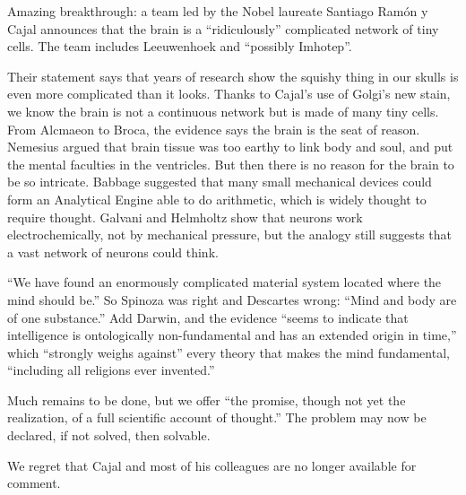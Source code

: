 
Amazing breakthrough: a team led by the Nobel laureate Santiago Ram\'on y Cajal announces that the brain is a ``ridiculously'' complicated network of tiny cells. The team includes Leeuwenhoek and ``possibly Imhotep''. 

Their statement says that years of research show the squishy thing in our skulls is even more complicated than it looks. Thanks to Cajal's use of Golgi's new stain, we know the brain is not a continuous network but is made of many tiny cells.  From Alcmaeon to Broca, the evidence says the brain is the seat of reason. Nemesius argued that brain tissue was too earthy to link body and soul, and put the mental faculties in the ventricles. But then there is no reason for the brain to be so intricate. Babbage suggested that many small mechanical devices could form an Analytical Engine able to do arithmetic, which is widely thought to require thought. Galvani and Helmholtz show that neurons work electrochemically, not by mechanical pressure, but the analogy still suggests that a vast network of neurons could think.

``We have found an enormously complicated material system located where the mind should be.'' So Spinoza was right and Descartes wrong: ``Mind and body are of one substance.''  Add Darwin, and the evidence ``seems to indicate that intelligence is ontologically non-fundamental and has an extended origin in time,'' which ``strongly weighs against'' every theory that makes the mind fundamental, ``including all religions ever invented.'' 

Much remains to be done, but we offer ``the promise, though not yet the realization, of a full scientific account of thought.'' The problem may now be declared, if not solved, then solvable.

We regret that Cajal and most of his colleagues are no longer available for comment.
